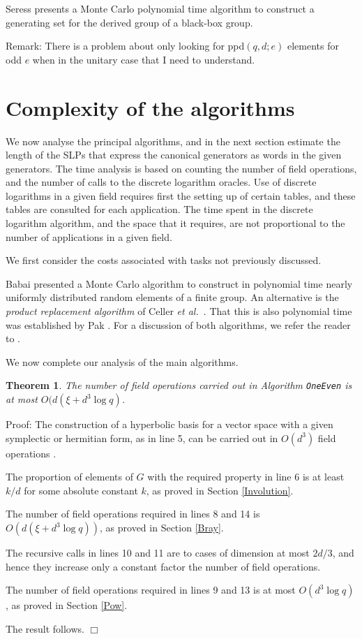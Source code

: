 \documentclass[12pt]{article}
\newtheorem{theorem}[definition]{Theorem}
\newenvironment{proof}{\normalsize {\sc Proof}:}{{\hfill $\Box$ \\}}
\begin{document}
Seress \cite[Theorem 2.3.9]{Seress03} presents 
a Monte Carlo polynomial time
algorithm to construct a generating set for the 
derived group of a black-box group. 

Remark: There is a problem about only looking for ppd$(q,d;e)$ elements for
odd $e$ when in the unitary case that I need to understand.


\section{Complexity of the algorithms} 
\label{Analysis}
We now analyse the principal
algorithms, and in the next section estimate the length of the SLPs
that express the canonical generators as words in  the given
generators. The time analysis is based on counting the number of
field operations, and the number of calls to 
the discrete logarithm oracles. Use of discrete
logarithms in a given field requires first the setting up of certain
tables, and these tables are consulted for each application. The
time spent in the discrete logarithm algorithm, and the space that it
requires, are  not proportional to the number of applications in a
given field.

We first consider the costs associated with tasks 
not previously discussed.

Babai \cite{Babai91} presented a Monte Carlo algorithm to
construct in polynomial time nearly uniformly distributed 
random elements of a finite group.  An alternative is the 
{\it product replacement algorithm} of Celler
{\it et al.\ }\cite{Celleretal95}.
That this is also polynomial time was
established by Pak \cite{Pak00}.
For a discussion of both algorithms, we refer
the reader to \cite[pp.\ 26-30]{Seress03}.


We now complete our analysis of the main algorithms.
\begin{theorem}\label{Theorem1}  
The number of field operations carried out in
Algorithm {\tt OneEven} is at most  
$O(d (\xi + d^3 \log q)$.
\end{theorem}
\begin{proof} 
The construction of a hyperbolic basis for a vector space with a given
symplectic or hermitian form, as in line 5, can be carried out
in $O(d^3)$ field operations \cite[Chapter 2]{Grove02}.

The proportion of elements of $G$ with the required property in line 6
is at least $k/d$ for some absolute constant $k$, as proved in Section
\ref{Involution}.

The number of field operations required in lines 8 and 14 is 
$O(d(\xi + d^3 \log q))$,
as proved in Section \ref{Bray}.

The recursive calls in  lines 10 and 11 are to cases of dimension at
most $2d/3$, and hence they increase only a constant factor 
the number of field operations. 

The number of field operations required in lines 9 and 13 is at most 
$O(d^3\log q)$, as proved in Section \ref{Pow}. 

The result follows.
\end{proof}
\end{document}
